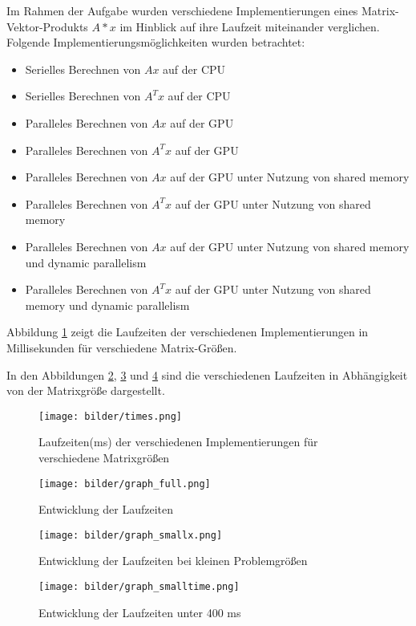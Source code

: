 \documentclass[11pt]{scrreprt}
\begin{document}
Im Rahmen der Aufgabe wurden verschiedene Implementierungen eines Matrix-Vektor-Produkts $A*x$ im Hinblick auf ihre Laufzeit miteinander verglichen. Folgende Implementierungsmöglichkeiten wurden betrachtet:

\begin{itemize}
\item Serielles Berechnen von $Ax$ auf der CPU
\item Serielles Berechnen von $A^T  x$ auf der CPU
\item Paralleles Berechnen von $Ax$ auf der GPU
\item Paralleles Berechnen von $A^T  x$ auf der GPU
\item Paralleles Berechnen von $Ax$ auf der GPU unter Nutzung von shared memory
\item Paralleles Berechnen von $A^T x$ auf der GPU unter Nutzung von shared memory
\item Paralleles Berechnen von $Ax$ auf der GPU unter Nutzung von shared memory und dynamic parallelism
\item Paralleles Berechnen von $A^T  x$ auf der GPU unter Nutzung von shared memory und dynamic parallelism
\end{itemize}
Abbildung \ref{im:times} zeigt die Laufzeiten der verschiedenen Implementierungen in Millisekunden für verschiedene Matrix-Größen. 

In den Abbildungen \ref{im:graph_full}, \ref{im:graph_smallx} und \ref{im:graph_smalltime} sind die verschiedenen Laufzeiten in Abhängigkeit von der Matrixgröße dargestellt.

\begin{figure}
\texttt{[image: bilder/times.png]}
\caption{Laufzeiten(ms) der verschiedenen Implementierungen für verschiedene Matrixgrößen}\label{im:times}
\end{figure}
\begin{figure}
\texttt{[image: bilder/graph\_full.png]}
\caption{Entwicklung der Laufzeiten}
\label{im:graph_full}
\end{figure}
\begin{figure}
\texttt{[image: bilder/graph\_smallx.png]}
\caption{Entwicklung der Laufzeiten bei kleinen Problemgrößen}
\label{im:graph_smallx}
\end{figure}
\begin{figure}
\texttt{[image: bilder/graph\_smalltime.png]}
\caption{Entwicklung der Laufzeiten unter 400 ms}
\label{im:graph_smalltime}
\end{figure}
\end{document}
